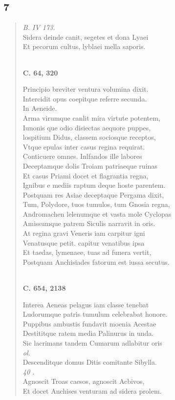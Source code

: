 \documentclass[11pt, a4paper]{report}
\begin{document}
            \subsection*{7}
      \begin{verse}
      \textit{B. IV 173.} \\ Sidera deinde canit, segetes et dona Lyaei \\ Et pecorum cultus, lyblaei mella saporis. \\ 
        ﻿\pagebreak 
    \begin{center} \textbf{C. 64, 320} \end{center} \marginpar{[126]} Principio breviter ventura volumina dixit. \\ Intercidit opus coepitque referre secunda. \\ In Aeneide. \\ Arma virumque canlit mira virtute potentem, \\ Iunonis \lbrack que \rbrack  odio disiectas aequore puppes, \\ lospitium Didus, classem sociosque receptos, \\ Vtque epulas inter casus regina requirat. \\ Conticuere omnes. Inlfandos ille labores \\ Deceptamque dolis Troiam patriaeque ruinas \\ Et casus Priami docet et flagrantia regna, \\ Ignibus e mediis raptum deque hoste parentem. \\ Postquam res Asiae \rbrack  deceptaque Pergama dixit, \\ Tum, Polydore, tuos tumulos, tum Gnosia regna, \\ Andromachen lelenumque et vasta mole Cyclopas \\ Amissumque patrem Siculis narravit in oris. \\ At regina gravi Veneris iam carpitur igni \rbrack  \\ Venatusque petit. capitur venatibus ipsa \\ Et taedas, lymenaee, tuas ad funera vertit, \\ Postquam Anchisiades fatorum est iussa secutus. \\ 
        ﻿\pagebreak 
    \begin{center} \textbf{C. 654, 2138} \end{center} \marginpar{[127]} Interea Aeneas pelagus iam classe tenebat \rbrack  \\ Ludorumque patris tumulum celebrabat honore. \\ Puppibus ambustis fundavit moenia Acestae \\ Destititque ratem media Palinurus in unda. \\ Sic lacrimans tandem Cumarum adlabitur oris \rbrack  \\ \textit{ol.} \\ Descenditque domus Ditis comitante Sibylla. \\ \textit{40 .} \\ Agnoscit Troas caesos, agnoscit Acbivos, \\ Et docet Anchises venturam ad sidera prolem. \\ 

\end{verse}
\end{document}
